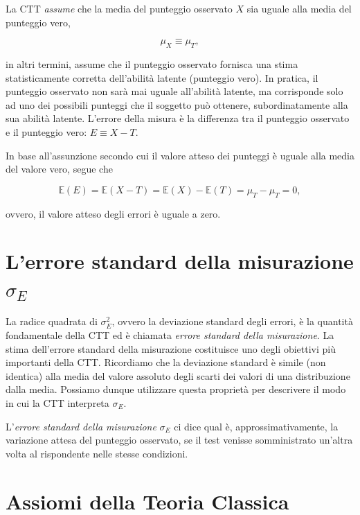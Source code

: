 \documentclass[
  11pt,
]{krantz}
\newcommand{\E}{\mathbb{E}} %
\theoremstyle{definition}
\theoremstyle{definition}
\theoremstyle{definition}
\theoremstyle{definition}
\theoremstyle{remark}
\begin{document}
La CTT \emph{assume} che la media del punteggio osservato \(X\) sia uguale alla media del punteggio vero,

\[
\mu_X \equiv \mu_{T},
\label{eq:assunzione-media-x-media-t}
\]

in altri termini, assume che il punteggio osservato fornisca una stima statisticamente corretta dell'abilità latente (punteggio vero). In pratica, il punteggio osservato non sarà mai uguale all'abilità latente, ma corrisponde solo ad uno dei possibili punteggi che il soggetto può ottenere, subordinatamente alla sua abilità latente. L'errore della misura è la differenza tra il punteggio osservato e il punteggio vero: \(E \equiv X - T.\)

In base all'assunzione secondo cui il valore atteso dei punteggi è uguale alla media del valore vero, segue che

\[
\E(E) = \E(X - T) = \E(X) - \E(T) = \mu_{T} - \mu_{T} = 0,
\]

ovvero, il valore atteso degli errori è uguale a zero.

\hypertarget{lerrore-standard-della-misurazione-sigma_e}{%
\section{\texorpdfstring{L'errore standard della misurazione \(\sigma_E\)}{L'errore standard della misurazione \textbackslash sigma\_E}}\label{lerrore-standard-della-misurazione-sigma_e}}

La radice quadrata di \(\sigma^2_E\), ovvero la deviazione standard degli errori, è la quantità fondamentale della CTT ed è chiamata \emph{errore standard della misurazione}. La stima dell'errore standard della misurazione costituisce uno degli obiettivi più importanti della CTT. Ricordiamo che la deviazione standard è simile (non identica) alla media del valore assoluto degli scarti dei valori di una distribuzione dalla media. Possiamo dunque utilizzare questa proprietà per descrivere il modo in cui la CTT interpreta \(\sigma_E\).

L'\emph{errore standard della misurazione} \(\sigma_E\) ci dice qual è, approssimativamente, la variazione attesa del punteggio osservato, se il test venisse somministrato un'altra volta al rispondente nelle stesse condizioni.

\hypertarget{assiomi-della-teoria-classica}{%
\section{Assiomi della Teoria Classica}\label{assiomi-della-teoria-classica}}
\end{document}
